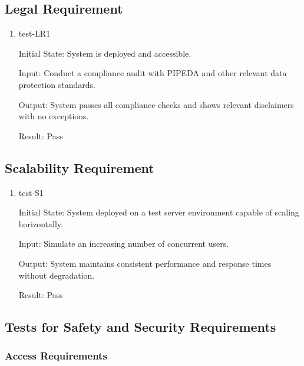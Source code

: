\documentclass[12pt, titlepage]{article}
\begin{document}
\subsection{Legal Requirement} \label{section:4.8}

\begin{enumerate}
\item test-LR1 \label{test-LR1}

Initial State:  System is deployed and accessible.

Input: Conduct a compliance audit with PIPEDA and other relevant data protection standards.

Output: System passes all compliance checks and shows relevant disclaimers with no exceptions.

Result: Pass

\end{enumerate}

\subsection{Scalability Requirement} \label{section:4.9}

\begin{enumerate}
\item test-S1 \label{test-S1}

Initial State: System deployed on a test server environment capable of scaling horizontally.

Input: Simulate an increasing number of concurrent users.

Output: System maintains consistent performance and response times without degradation.

Result: Pass

\end{enumerate}

\subsection{Tests for Safety and Security Requirements} \label{section:4.10}

\subsubsection{Access Requirements } \label{section:4.10.1}
\end{document}
